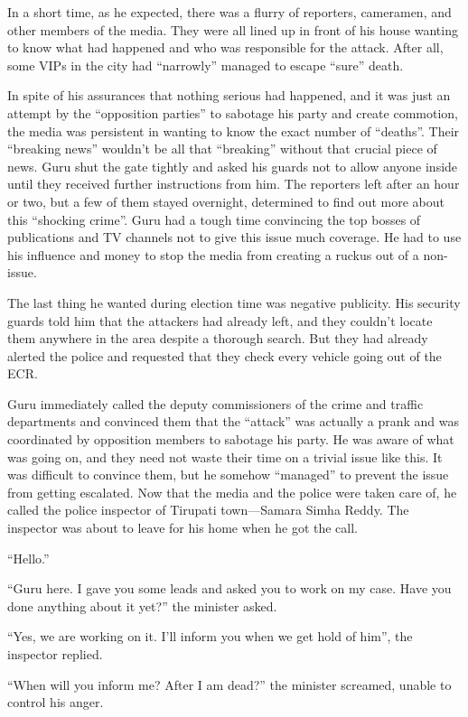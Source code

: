 In a short time, as he expected, there was a flurry of reporters, cameramen,
and other members of the media. They were all lined up in front of his house
wanting to know what had happened and who was responsible for the attack. After
all, some VIPs in the city had “narrowly” managed to escape “sure” death.

In spite of his assurances that nothing serious had happened, and it was just an
attempt by the “opposition parties” to sabotage his party and create commotion,
the media was persistent in wanting to know the exact number of “deaths”. Their “breaking
news” wouldn't be all that “breaking” without that crucial piece of news. Guru
shut the gate tightly and asked his guards not to allow anyone inside until they
received further instructions from him. The reporters left after an hour or two,
but a few of them stayed overnight, determined to find out more about this
“shocking crime”. Guru had a tough time convincing the top bosses of
publications and TV channels not to give this issue much coverage. He had to use
his influence and money to stop the media from creating a ruckus out of a non-issue.

The last thing he wanted during election time was negative publicity. His
security guards told him that the attackers had already left, and they couldn't
locate them anywhere in the area despite a thorough search. But they had already
alerted the police and requested that they check every vehicle going out of the ECR.

Guru immediately called the deputy commissioners of the crime and
traffic departments and convinced them that the “attack” was actually a prank
and was coordinated by opposition members to sabotage his party. He was aware of
what was going on, and they need not waste their time on a trivial issue like
this. It was difficult to convince them, but he somehow “managed” to prevent the
issue from getting escalated.  Now that the media and the police were taken care of,
he called the police inspector of Tirupati town—Samara Simha Reddy. The
inspector was about to leave for his home when he got the call.

“Hello.”

“Guru here. I gave you some leads and asked you to work on my case. Have you
done anything about it yet?” the minister asked.

“Yes, we are working on it. I'll inform you when we get hold of him”, the
inspector replied.

“When will you inform me? After I am dead?” the minister screamed, unable to
control his anger.

